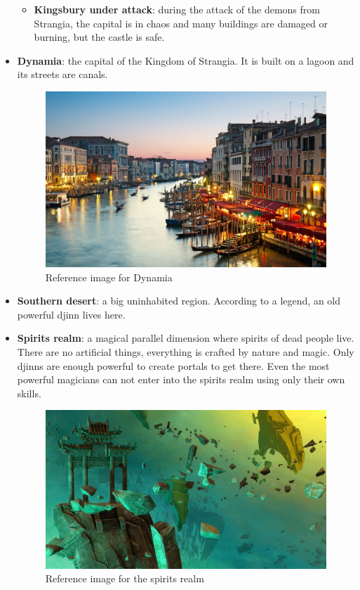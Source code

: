 \begin{itemize}
\begin{itemize}
	\item \textbf{Kingsbury under attack}: during the attack of the demons from Strangia, the capital is in chaos and many buildings are damaged or burning, but the castle is safe.
\end{itemize}
	
	\item \textbf{Dynamia}: the capital of the Kingdom of Strangia. It is built on a lagoon and its streets are canals.
	\begin{figure}[H]
	  \centering
	  \includegraphics[width=12cm]{../Images/Locations/dynamia}
	  \caption{Reference image for Dynamia}
	\end{figure}
	
	\item \textbf{Southern desert}: a big uninhabited region. According to a legend, an old powerful djinn lives here.
	
	\item \textbf{Spirits realm}: a magical parallel dimension where spirits of dead people live. There are no artificial things, everything is crafted by nature and magic. Only djinns are enough powerful to create portals to get there. Even the most powerful magicians can not enter into the spirits realm using only their own skills.
	\begin{figure}[H]
	  \centering
	  \includegraphics[width=12cm]{../Images/Locations/spiritsRealm}
	  \caption{Reference image for the spirits realm}
	\end{figure}


\end{itemize}
